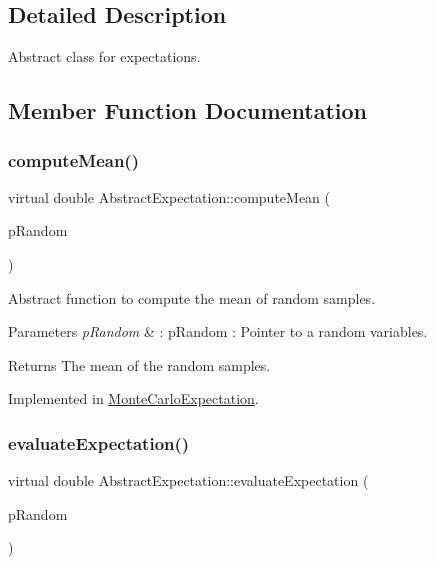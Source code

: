 \subsection{Detailed Description}
Abstract class for expectations. 

\subsection{Member Function Documentation}
\mbox{\label{classAbstractExpectation_ac0fd8ea2ea546f6d01adec641886db14}} 
\subsubsection{\texorpdfstring{compute\+Mean()}{computeMean()}}
{\footnotesize\ttfamily virtual double Abstract\+Expectation\+::compute\+Mean (\begin{DoxyParamCaption}\item[{const \hyperlink{classAbstractVariable}{Abstract\+Variable} $\ast$}]{p\+Random }\end{DoxyParamCaption})\hspace{0.3cm}{\ttfamily [pure virtual]}}



Abstract function to compute the mean of random samples. 


\begin{DoxyParams}{Parameters}
{\em p\+Random} & \+: p\+Random \+: Pointer to a random variables. \\
\hline
\end{DoxyParams}
\begin{DoxyReturn}{Returns}
The mean of the random samples. 
\end{DoxyReturn}


Implemented in \hyperlink{classMonteCarloExpectation_a6f4489cc63ca48fcbf5f2cdd6258dfcc}{Monte\+Carlo\+Expectation}.

\mbox{\label{classAbstractExpectation_a3f3bc9fdcbd4856212857fc0fa4445a5}} 
\subsubsection{\texorpdfstring{evaluate\+Expectation()}{evaluateExpectation()}}
{\footnotesize\ttfamily virtual double Abstract\+Expectation\+::evaluate\+Expectation (\begin{DoxyParamCaption}\item[{const \hyperlink{classAbstractVariable}{Abstract\+Variable} $\ast$}]{p\+Random }\end{DoxyParamCaption})\hspace{0.3cm}{\ttfamily [pure virtual]}}



